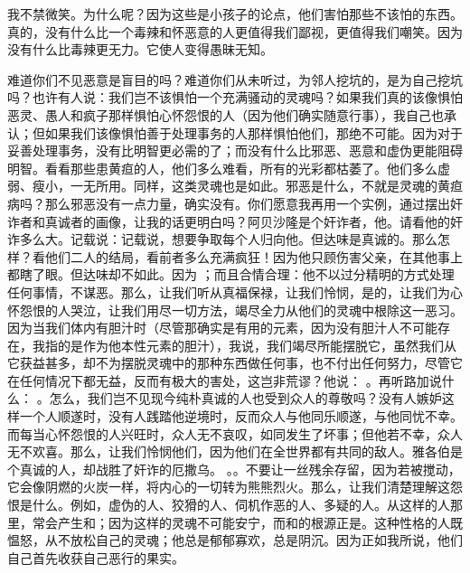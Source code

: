 我不禁微笑。为什么呢？因为这些是小孩子的论点，他们害怕那些不该怕的东西。真的，没有什么比一个毒辣和怀恶意的人更值得我们鄙视，更值得我们嘲笑。因为没有什么比毒辣更无力。它使人变得愚昧无知。\par

难道你们不见恶意是盲目的吗？难道你们从未听过，为邻人挖坑的，是为自己挖坑吗？也许有人说：我们岂不该惧怕一个充满骚动的灵魂吗？如果我们真的该像惧怕恶灵、愚人和疯子那样惧怕心怀怨恨的人（因为他们确实随意行事），我自己也承认；但如果我们该像惧怕善于处理事务的人那样惧怕他们，那绝不可能。因为对于妥善处理事务，没有比明智更必需的了；而没有什么比邪恶、恶意和虚伪更能阻碍明智。看看那些患黄疸的人，他们多么难看，所有的光彩都枯萎了。他们多么虚弱、瘦小，一无所用。同样，这类灵魂也是如此。邪恶是什么，不就是灵魂的黄疸病吗？那么邪恶没有一点力量，确实没有。你们愿意我再用一个实例，通过摆出奸诈者和真诚者的画像，让我的话更明白吗？阿贝沙隆是个奸诈者，他。请看他的奸诈多么大。记载说：记载说，想要争取每个人归向他。但达味是真诚的。那么怎样？看他们二人的结局，看前者多么充满疯狂！因为他只顾伤害父亲，在其他事上都瞎了眼。但达味却不如此。因为 ；而且合情合理：他不以过分精明的方式处理任何事情，不谋恶。那么，让我们听从真福保禄，让我们怜悯，是的，让我们为心怀怨恨的人哭泣，让我们用尽一切方法，竭尽全力从他们的灵魂中根除这一恶习。因为当我们体内有胆汁时（尽管那确实是有用的元素，因为没有胆汁人不可能存在，我指的是作为他本性元素的胆汁），我说，我们竭尽所能摆脱它，虽然我们从它获益甚多，却不为摆脱灵魂中的那种东西做任何事，也不付出任何努力，尽管它在任何情况下都无益，反而有极大的害处，这岂非荒谬？他说： 。再听路加说什么： 。怎么，我们岂不见现今纯朴真诚的人也受到众人的尊敬吗？没有人嫉妒这样一个人顺遂时，没有人践踏他逆境时，反而众人与他同乐顺遂，与他同忧不幸。而每当心怀怨恨的人兴旺时，众人无不哀叹，如同发生了坏事；但他若不幸，众人无不欢喜。那么，让我们怜悯他们，因为他们在全世界都有共同的敌人。雅各伯是个真诚的人，却战胜了奸诈的厄撒乌。 。。不要让一丝残余存留，因为若被搅动，它会像阴燃的火炭一样，将内心的一切转为熊熊烈火。那么，让我们清楚理解这怨恨是什么。例如，虚伪的人、狡猾的人、伺机作恶的人、多疑的人。从这样的人那里，常会产生和；因为这样的灵魂不可能安宁，而和的根源正是。这种性格的人既愠怒，从不放松自己的灵魂；他总是郁郁寡欢，总是阴沉。因为正如我所说，他们自己首先收获自己恶行的果实。\par

